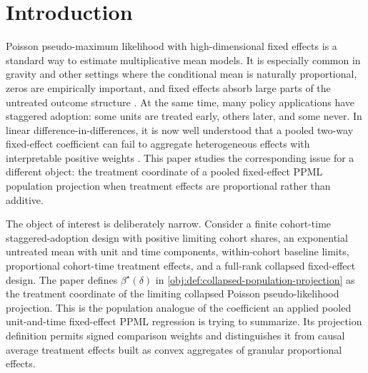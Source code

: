 \begin{abstract}
This paper studies the population treatment coefficient from pooling a staggered-adoption panel in a unit-and-time fixed-effect Poisson pseudo-likelihood. We show that this projection coefficient can be negative even when every cohort-time proportional treatment effect is positive. The failure reflects heterogeneous effects interacting with the fixed-effect PPML score: a four-cohort design with equal shares and flat untreated means provides an explicit sign reversal, while a positive-weight proportional treatment-on-the-treated target remains positive. The result characterizes the interpretation of the deterministic population projection targeted by the pooled criterion.
\end{abstract}

\section{Introduction}

Poisson pseudo-maximum likelihood with high-dimensional fixed effects is a standard way to estimate multiplicative mean models. It is especially common in gravity and other settings where the conditional mean is naturally proportional, zeros are empirically important, and fixed effects absorb large parts of the untreated outcome structure \citep{SantosSilvaTenreyro2006,SantosSilvaTenreyro2011,CorreiaGuimaraesZylkin2020}. At the same time, many policy applications have staggered adoption: some units are treated early, others later, and some never. In linear difference-in-differences, it is now well understood that a pooled two-way fixed-effect coefficient can fail to aggregate heterogeneous effects with interpretable positive weights \citep{GoodmanBacon2021,deChaisemartinDHaultfoeuille2020TWFE,CallawaySantAnna2021,SunAbraham2021,BorusyakJaravelSpiess2024}. This paper studies the corresponding issue for a different object: the treatment coordinate of a pooled fixed-effect PPML population projection when treatment effects are proportional rather than additive.

The object of interest is deliberately narrow. Consider a finite cohort-time staggered-adoption design with positive limiting cohort shares, an exponential untreated mean with unit and time components, within-cohort baseline limits, proportional cohort-time treatment effects, and a full-rank collapsed fixed-effect design. The paper defines \(\beta^\star(\delta)\) in \cref{obj:def:collapsed-population-projection} as the treatment coordinate of the limiting collapsed Poisson pseudo-likelihood projection. This is the population analogue of the coefficient an applied pooled unit-and-time fixed-effect PPML regression is trying to summarize. Its projection definition permits signed comparison weights and distinguishes it from causal average treatment effects built as convex aggregates of granular proportional effects.

